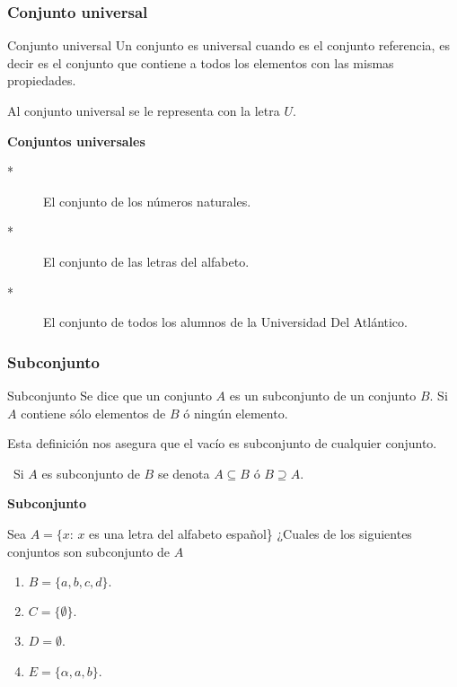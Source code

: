 \subsubsection{Conjunto universal}

\begin{defi}{Conjunto universal}{} Un conjunto es universal cuando
es el conjunto referencia, es decir es el conjunto que contiene a
todos los elementos con las mismas propiedades. \end{defi}

\notacion Al conjunto universal se le representa con la letra $U.$

\begin{ejemplo}{\bf Conjuntos universales} 
\begin{description}
\item [{{*}}] El conjunto de los números naturales.
\item [{{*}}] El conjunto de las letras del alfabeto.
\item [{{*}}] El conjunto de todos los alumnos de la Universidad Del Atlántico. 
\end{description}
\end{ejemplo}

\subsubsection{Subconjunto}

\begin{defi}{ Subconjunto}{} Se dice que un conjunto $A$ es un
subconjunto de un conjunto $B$. Si $A$ contiene sólo elementos de
$B$ ó ningún elemento. \end{defi}

Esta definición nos asegura que el vacío es subconjunto de cualquier
conjunto.

\notacion\ Si $A$ es subconjunto de $B$ se denota $A\subseteq B$
ó $B\supseteq A.$

\begin{ejemplo}{\bf Subconjunto}

Sea $A=\{x:\,x$ es una letra del alfabeto español\} ¿Cuales de los
siguientes conjuntos son subconjunto de $A$
\begin{enumerate}
\item $B=\{a,b,c,d\}.$
\item $C=\{\emptyset\}.$
\item $D=\emptyset$.
\item $E=\{\alpha,a,b\}$.
\end{enumerate}
\end{ejemplo}

